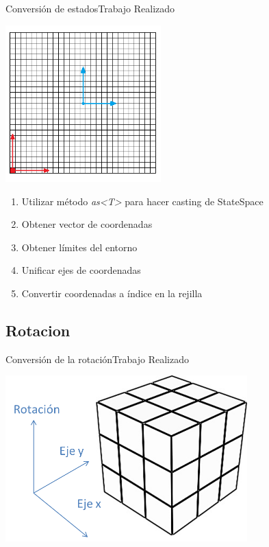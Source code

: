 \documentclass[10pt]{beamer}
\begin{document}
\begin{frame}{Conversión de estados}{Trabajo Realizado}
	\begin{multicols}{2}
		\includegraphics[width=0.45\textwidth,keepaspectratio]{ejes}	
		\begin{enumerate}
			\item Utilizar método \textit{as<T>} para hacer casting de StateSpace
			\item Obtener vector de coordenadas
			\item Obtener límites del entorno
			\item Unificar ejes de coordenadas
			\item Convertir coordenadas a índice en la rejilla
		\end{enumerate}
	\end{multicols}
\end{frame}

\subsection{Rotacion}
\begin{frame}{Conversión de la rotación}{Trabajo Realizado}
	\begin{center}	\includegraphics[width=0.7\textwidth,height=0.6\textheight,keepaspectratio]{rotacion}	
	\end{center}
\end{frame}
\end{document}
